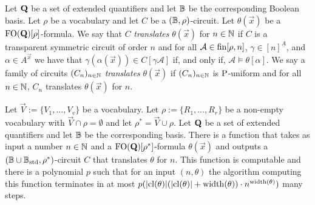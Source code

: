 \documentclass[../main/thesis.tex]{subfiles}
\begin{document}
Let $\mathbf{Q}$ be a set of extended quantifiers and let $\mathbb{B}$ be the
corresponding Boolean basis. Let $\rho$ be a vocabulary and let $C$ be a $(\mathbb{B},
\rho)$-circuit. Let $\theta(\vec{x})$ be a $\text{\upshape FO}(\mathbf{Q})[\rho]$-formula. We
say that $C$ \emph{translates} $\theta(\vec{x})$ for $n \in \mathbb{N}$ if $C$ is a
transparent symmetric circuit of order $n$ and for all $\mathcal{A} \in
\text{\upshape fin}{[\rho, n]}$, $\gamma \in [n]^{\underline{A}}$, and $\alpha \in A^{\vec{x}}$
we have that $\gamma (\alpha (\vec{x})) \in C[\gamma \mathcal{A}]$ if, and only
if, $\mathcal{A} \models \theta[\alpha]$. We say a family of circuits $(C_n)_{n
  \in \mathbb{N}}$ \emph{translates} $\theta(\vec{x})$ if $(C_n)_{n \in \mathbb{N}}$ is
$\mathrm{P}$-uniform and for all $n \in \mathbb{N}$, $C_n$ translates $\theta(\vec{x})$ for
$n$.

\begin{lem}
  Let $\vec{V} := \{V_1, \ldots, V_v\}$ be a vocabulary. Let $\rho := \{R_1,
  \ldots, R_r\}$ be a non-empty vocabulary with $\vec{V} \cap \rho = \emptyset$
  and let $\rho^* = \vec{V} \cup \rho$. Let $\mathbf{Q}$ be a set of extended
  quantifiers and let $\mathbb{B}$ be the corresponding basis. There is a function that
  takes as input a number $n \in \mathbb{N}$ and a $\text{\upshape FO}(\mathbf{Q})[\rho^*]$-formula
  $\theta(\vec{x})$ and outputs a $(\mathbb{B} \cup \mathbb{B}_{\text{std}}, \rho^*)$-circuit $C$ that
  translates $\theta$ for $n$. This function is computable and there is a
  polynomial $p$ such that for an input $(n, \theta)$ the algorithm computing
  this function terminates in at most $p(\vert \mathrm{cl}(\theta) \vert (\vert
  \mathrm{cl}(\theta) \vert + \mathrm{width}(\theta)) \cdot n^{\mathrm{width}(\theta)})$ many steps.
  \label{lem:translating-FOquant-to-formulas}
\end{lem}
\end{document}

